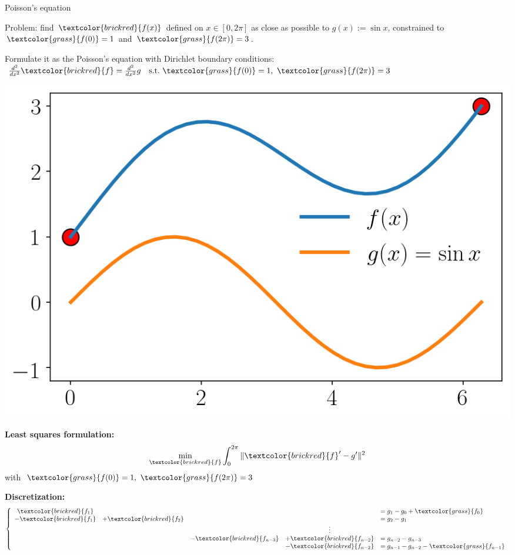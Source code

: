 \documentclass[UKenglish,aspectratio=169]{beamer}
\newcommand\unknown[1]{\textcolor{brickred}{#1}}
\newcommand\known[1]{\textcolor{grass}{#1}}
\begin{document}
\begin{frame}{Poisson's equation}
\begin{minipage}{.45\linewidth}
Problem: find $\unknown{f(x)}$ defined on $x\in[0,2\pi]$ as close as possible to $g(x):=\sin x$, constrained to $\known{f(0)}=1$ and $\known{f(2\pi)} = 3$.

\vspace{5pt}
Formulate it as the Poisson's equation with Dirichlet boundary conditions:\\
$
\frac{d^2}{dx^2}\unknown{f}  = \frac{d^2}{dx^2} g \quad \text{s.t.~} \known{f(0)}=1,~\known{f(2\pi)} = 3
$
\end{minipage}
\qquad
\begin{minipage}{.4\linewidth}
\centerline{\includegraphics[width=\linewidth]{../manuscript/img/pie-1d.png}}
\end{minipage}
\pause
\begin{minipage}[t]{.35\linewidth}
\strut\vspace*{-\baselineskip}\newline
\textbf{Least squares formulation:}
$$
\min\limits_{\unknown{f}} \int_0^{2\pi} \|\unknown{f}' - g'\|^2
$$
with $\known{f(0)}=1,~\known{f(2\pi)} = 3$
\end{minipage}
\pause
\qquad
\begin{minipage}[t]{.55\linewidth}
\strut\vspace*{-\baselineskip}\newline
\textbf{Discretization:}
$$
\left \{ \begin{array}{ccccl}
\unknown{f_1} &       &       &           & =  g_1 - g_0 + \known{f_0}  \\
-\unknown{f_1} & + \unknown{f_2} &       &           & = g_2 - g_1 \\
    &       &       & \vdots    &             \\
     &        &  -\unknown{f_{n-3}}     &  +\unknown{f_{n-2}}          & = g_{n-2} - g_{n-3} \\
     &        &       & - \unknown{f_{n-2}} & =  g_{n-1}-g_{n-2} -\known{f_{n-1}}
\end{array} \right.
$$
\end{minipage}
\end{frame}
\end{document}
